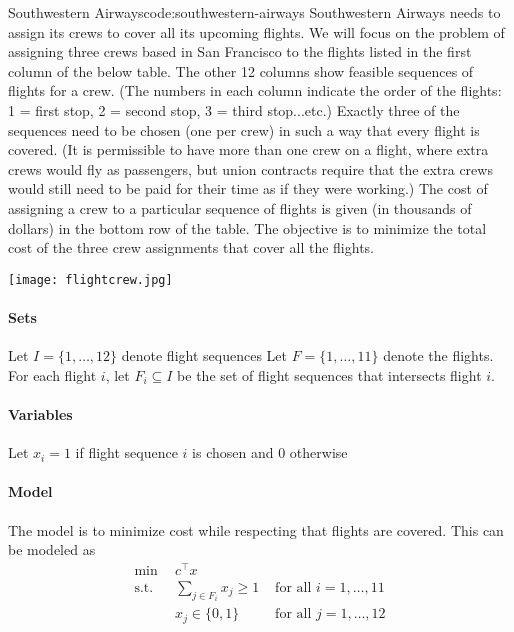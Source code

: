 \documentclass[../open-optimization/open-optimization.tex]{subfiles}
\begin{document}
\begin{examplewithcode}{Southwestern Airways\footnotemark}{code:southwestern-airways}
\label{example:southwestern-airways}
Southwestern Airways needs to assign its crews to cover all its upcoming flights.  We will focus on the problem of assigning three crews based in San Francisco to the flights listed in the first column of the below table.  The other 12 columns show feasible sequences of flights for a crew.  (The numbers in each column indicate the order of the flights: 1 = first stop, 2 = second stop, 3 = third stop...etc.) Exactly three of the sequences need to be chosen (one per crew) in such a way that every flight is covered. (It is permissible to have more than one crew on a flight, where extra crews would fly as passengers, but union contracts require that the extra crews would still need to be paid for their time as if they were working.) The cost of assigning a crew to a particular sequence of flights is given (in thousands of dollars) in the bottom row of the table.  The objective is to minimize the total cost of the three crew assignments that cover all the flights.

\texttt{[image: flightcrew.jpg]}\footnotemark

\paragraph{Sets}
Let $I = \{1,\dots, 12\}$ denote flight sequences
Let $F = \{1, \dots, 11\}$ denote the flights.
For each flight $i$, let $F_i \subseteq I$ be the set of flight sequences that intersects flight $i$.
\paragraph{Variables}
Let $x_i = 1$ if flight sequence $i$ is chosen and $0$ otherwise
\paragraph{Model}
The model is to minimize cost while respecting that flights are covered.  This can be modeled as 
\begin{align*}
\min \ \ & c^\top x\\
\text{s.t.} \ \ &  \sum_{j \in F_i} x_j \geq 1 & \text{ for all } i=1, \dots, 11\\
& x_j \in \{0,1\}  & \text{ for all } j=1, \dots, 12
\end{align*}


\end{examplewithcode}
\end{document}
